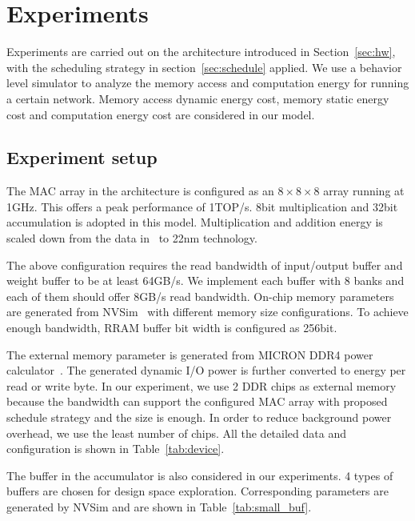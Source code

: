 \section{Experiments}\label{sec:exp}



Experiments are carried out on the architecture introduced in Section~\ref{sec:hw}, with the scheduling strategy in section~\ref{sec:schedule} applied. We use a behavior level simulator to analyze the memory access and computation energy for running a certain network. Memory access dynamic energy cost, memory static energy cost and computation energy cost are considered in our model.

\subsection{Experiment setup}
The MAC array in the architecture is configured as an $8\times8\times8$ array running at 1GHz. This offers a peak performance of 1TOP/s. 8bit multiplication and 32bit accumulation is adopted in this model. Multiplication and addition energy is scaled down from the data in~\cite{mac_energy} to 22nm technology. 

The above configuration requires the read bandwidth of input/output buffer and weight buffer to be at least 64GB/s. We implement each buffer with 8 banks and each of them should offer 8GB/s read bandwidth. On-chip memory parameters are generated from NVSim~\cite{dong2014nvsim} with different memory size configurations. To achieve enough bandwidth, RRAM buffer bit width is configured as 256bit. 

The external memory parameter is generated from MICRON DDR4 power calculator~\cite{powercalc}. The generated dynamic I/O power is further converted to energy per read or write byte. In our experiment, we use 2 DDR chips as external memory because the bandwidth can support the configured MAC array with proposed schedule strategy and the size is enough. In order to reduce background power overhead, we use the least number of chips. All the detailed data and configuration is shown in Table~\ref{tab:device}. 

The buffer in the accumulator is also considered in our experiments. 4 types of buffers are chosen for design space exploration. Corresponding parameters are generated by NVSim and are shown in Table~\ref{tab:small_buf}.



